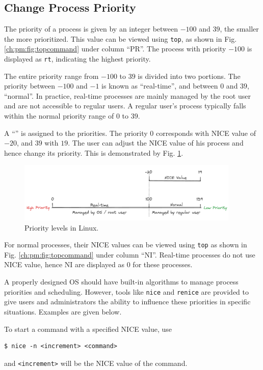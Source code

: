 \subsection{Change Process Priority}

The priority of a process is given by an integer between $-100$ and $39$, the smaller the more prioritized. This value can be viewed using \verb|top|, as shown in Fig. \ref{ch:pm:fig:topcommand} under column ``PR''. The process with priority $-100$ is displayed as \verb|rt|, indicating the highest priority.

The entire priority range from $-100$ to $39$ is divided into two portions. The priority between $-100$ and $-1$ is known as ``real-time'', and between $0$ and $39$, ``normal''. In practice, real-time processes are mainly managed by the root user and are not accessible to regular users. A regular user's process typically falls within the normal priority range of $0$ to $39$. 

A ``'' is assigned to the priorities. The priority $0$ corresponds with NICE value of $-20$, and $39$ with $19$. The user can adjust the NICE value of his process and hence change its priority. This is demonstrated by Fig. \ref{ch:pm:fig:priority}.

\begin{figure}[htbp]
	\centering
	\includegraphics[width=300pt]{chapters/part-1/figures/priority.png}
	\caption{Priority levels in Linux.} \label{ch:pm:fig:priority}
\end{figure}

For normal processes, their NICE values can be viewed using \verb|top| as shown in Fig. \ref{ch:pm:fig:topcommand} under column ``NI''. Real-time processes do not use NICE value, hence NI are displayed as $0$ for these processes.

A properly designed OS should have built-in algorithms to manage process priorities and scheduling. However, tools like \verb|nice| and \verb|renice| are provided to give users and administrators the ability to influence these priorities in specific situations. Examples are given below.

To start a command with a specified NICE value, use
\begin{lstlisting}
$ nice -n <increment> <command>
\end{lstlisting}
and \verb|<increment>| will be the NICE value of the command.

